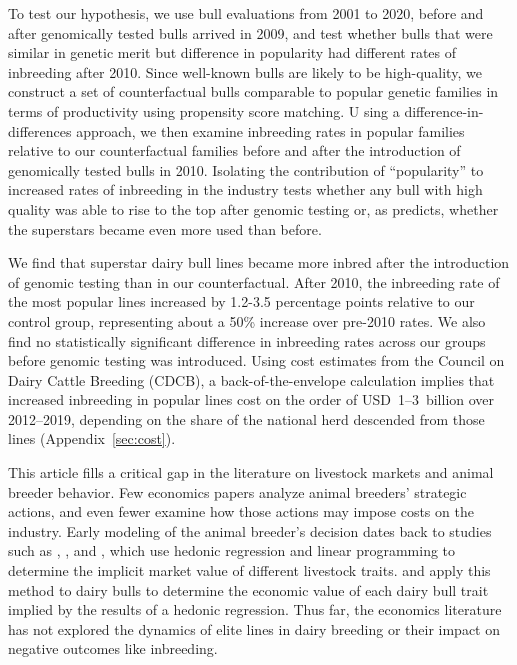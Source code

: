 \documentclass[12pt,letterpaper]{article}
\begin{document}
To test our hypothesis, we use bull evaluations from 2001 to 2020, before and after genomically tested bulls arrived in 2009, and test whether bulls that were similar in genetic merit but difference in popularity had different rates of inbreeding after 2010. 
Since well-known bulls are likely to be high-quality, we construct a set of counterfactual bulls comparable to popular genetic families in terms of productivity using propensity score matching. U
sing a difference-in-differences approach, we then examine inbreeding rates in popular families relative to our counterfactual families before and after the introduction of genomically tested bulls in 2010. 
Isolating the contribution of ``popularity'' to increased rates of inbreeding in the industry tests whether any bull with high quality was able to rise to the top after genomic testing or, as \citet{adler1985stardom} predicts, whether the superstars became even more used than before.

We find that superstar dairy bull lines became more inbred after the introduction of genomic testing than in our counterfactual. 
After 2010, the inbreeding rate of the most popular lines increased by 1.2-3.5 percentage points relative to our control group, representing about a 50\% increase over pre-2010 rates. 
We also find no statistically significant difference in inbreeding rates across our groups before genomic testing was introduced. 
Using cost estimates from the Council on Dairy Cattle Breeding (CDCB), a back-of-the-envelope calculation implies that increased inbreeding in popular lines cost on the order of USD~1--3~billion over 2012--2019, depending on the share of the national herd descended from those lines (Appendix~\ref{sec:cost}).

This article fills a critical gap in the literature on livestock markets and animal breeder behavior. 
Few economics papers analyze animal breeders' strategic actions, and even fewer examine how those actions may impose costs on the industry. 
Early modeling of the animal breeder's decision dates back to studies such as \citet{ladd1978}, \citet{Kerr1984}, and \citet{Melton1994}, which use hedonic regression and linear programming to determine the implicit market value of different livestock traits. 
\citet{Richards1996} and \citet{Schroeder1992} apply this method to dairy bulls to determine the economic value of each dairy bull trait implied by the results of a hedonic regression. 
Thus far, the economics literature has not explored the dynamics of elite lines in dairy breeding or their impact on negative outcomes like inbreeding.
\end{document}
